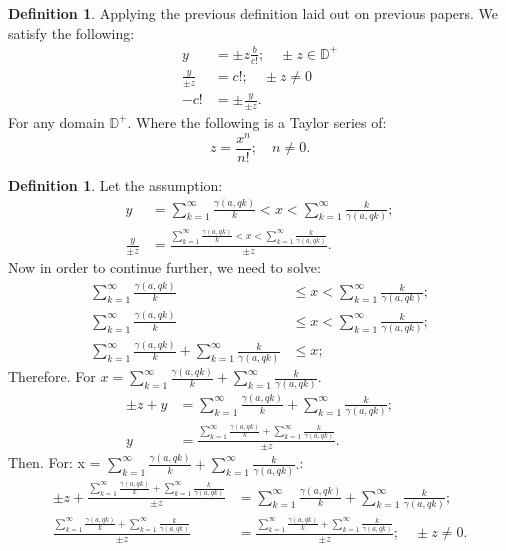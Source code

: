 \documentclass[10pt]{article}
\theoremstyle{plain}
\theoremstyle{definition}
\newtheorem{definition}[theorem]{Definition}
\theoremstyle{remark}
\begin{document}
	\begin{definition}
		Applying the previous definition laid out on previous papers. We satisfy the following:
		\begin{align*}
			y &= \pm z \frac{b}{c!}; \quad \pm z \in \mathbb{D}^{+}\\
			\frac{y}{\pm z} &= c!; \quad \pm z \neq 0\\
			-c! &= \pm \frac{y}{\pm z}.
		\end{align*}
		For any domain $\mathbb{D}^{+}$. Where the following is a Taylor series of:
		\begin{equation}
			z = \frac{x^n}{n!}; \quad n \neq 0.
		\end{equation}
	\end{definition}
	
	\begin{definition}
		Let the assumption:
		\begin{align*}
			y &= \sum_{k=1}^{\infty} \frac{\gamma(a, qk)}{k} < x < \sum_{k=1}^{\infty} \frac{k}{\gamma(a, qk)};\\
			\frac{y}{\pm z} &= \frac{\sum_{k=1}^{\infty} \frac{\gamma(a, qk)}{k} < x < \sum_{k=1}^{\infty} \frac{k}{\gamma(a, qk)}}{\pm z}.
		\end{align*}
		Now in order to continue further, we need to solve:
		\begin{align*}
			\sum_{k=1}^{\infty} \frac{\gamma(a, qk)}{k} &\leq x < \sum_{k=1}^{\infty} \frac{k}{\gamma(a, qk)};\\
			\sum_{k=1}^{\infty} \frac{\gamma(a, qk)}{k} &\leq x < \sum_{k=1}^{\infty} \frac{k}{\gamma(a, qk)};\\
			\sum_{k=1}^{\infty} \frac{\gamma(a, qk)}{k} + \sum_{k=1}^{\infty} \frac{k}{\gamma(a, qk)} &\leq x;
		\end{align*}
		Therefore. For $x = \sum_{k=1}^{\infty} \frac{\gamma(a, qk)}{k} + \sum_{k=1}^{\infty} \frac{k}{\gamma(a, qk)}.$
		\begin{align*}
			\pm z + y &= \sum_{k=1}^{\infty} \frac{\gamma(a, qk)}{k} + \sum_{k=1}^{\infty} \frac{k}{\gamma(a, qk)};\\
			y &= \frac{\sum_{k=1}^{\infty} \frac{\gamma(a, qk)}{k} + \sum_{k=1}^{\infty} \frac{k}{\gamma(a, qk)}}{\pm z}.
		\end{align*}
		Then. For: x = $\sum_{k=1}^{\infty} \frac{\gamma(a, qk)}{k} + \sum_{k=1}^{\infty} \frac{k}{\gamma(a, qk)}.$:
		\begin{align*}
			\pm z + \frac{\sum_{k=1}^{\infty} \frac{\gamma(a, qk)}{k} + \sum_{k=1}^{\infty}\frac{k}{\gamma(a, qk)}}{\pm z} &= \sum_{k=1}^{\infty} \frac{\gamma(a, qk)}{k} + \sum_{k=1}^{\infty}\frac{k}{\gamma(a, qk)};\\
			\frac{\sum_{k=1}^{\infty} \frac{\gamma(a, qk)}{k} + \sum_{k=1}^{\infty} \frac{k}{\gamma(a, qk)}}{\pm z} &= \frac{\sum_{k=1}^{\infty} \frac{\gamma(a, qk)}{k} + \sum_{k=1}^{\infty} \frac{k}{\gamma(a, qk)}}{\pm z}; \quad \pm z \neq 0.
		\end{align*}
	\end{definition}
	
\end{document}
